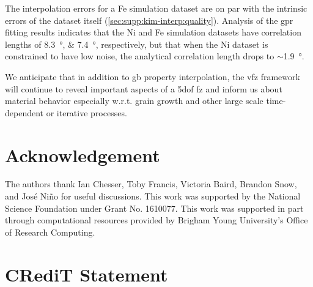 \documentclass[final,twocolumn,12pt]{elsarticle}
\begin{document}
	The interpolation errors for a Fe simulation dataset are on par with the intrinsic errors of the dataset itself (\cref{sec:supp:kim-interp:quality}). %
	Analysis of the \gls{gpr} fitting results indicates that the Ni and Fe simulation datasets have correlation lengths of \SIlist{8.3;7.4}{\degree}, respectively, but that when the Ni dataset is constrained to have low noise, the analytical correlation length drops to $\sim$\SI{1.9}{\degree}.%
	
	We anticipate that in addition to \gls{gb} property interpolation, the \gls{vfz} framework will continue to reveal important aspects of a \gls{5dof} \gls{fz} and inform us about material behavior especially w.r.t. grain growth and other large scale time-dependent or iterative processes.
	\section*{Acknowledgement}
	\label{sec:acknowledgement}
	
	The authors thank Ian Chesser, Toby Francis, Victoria Baird, Brandon Snow, and José Niño for useful discussions. This work was supported by the National Science Foundation under Grant No. 1610077. This work was supported in part through computational resources provided by Brigham Young University's Office of Research Computing.
	\section*{CRediT Statement}
	
	
\end{document}

